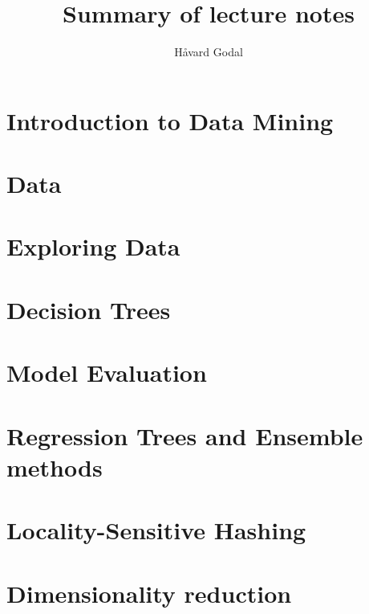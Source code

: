 \documentclass{notesclass}
\begin{document}
\begin{titlepage}
    \title{Summary of lecture notes}
    \author{Håvard Godal}
    \maketitle
\end{titlepage}

{
  \hypersetup{linkcolor=black}
  \tableofcontents
}

\chapter{Introduction to Data Mining}


\chapter{Data}


\chapter{Exploring Data}


\chapter{Decision Trees}


\chapter{Model Evaluation}


\chapter{Regression Trees and Ensemble methods}


\chapter{Locality-Sensitive Hashing}


\chapter{Dimensionality reduction}

\end{document}

